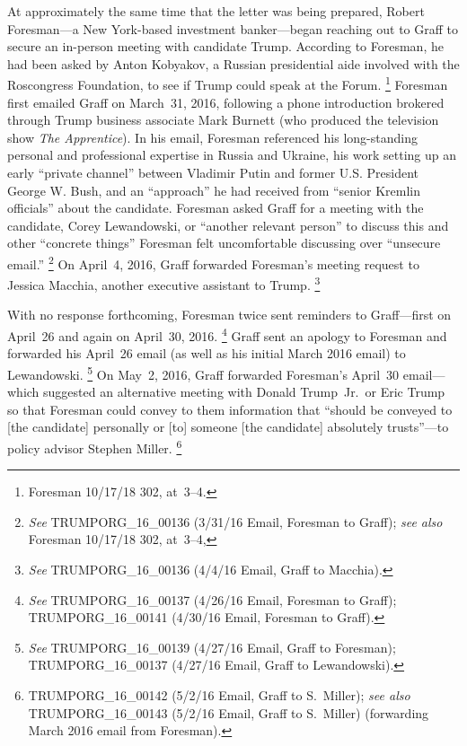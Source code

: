 At approximately the same time that the letter was being prepared, Robert Foresman---a New York-based investment banker---began reaching out to Graff to secure an in-person meeting with candidate Trump.
According to Foresman, he had been asked by Anton Kobyakov, a Russian presidential aide involved with the Roscongress Foundation, to see if Trump could speak at the Forum.%
\footnote{Foresman 10/17/18 302, at~3--4.}
Foresman first emailed Graff on March~31, 2016, following a phone introduction brokered through Trump business associate Mark Burnett (who produced the television show \textit{The Apprentice}).
In his email, Foresman referenced his long-standing personal and professional expertise in Russia and Ukraine, his work setting up an early ``private channel'' between Vladimir Putin and former U.S. President George W. Bush, and an ``approach'' he had received from ``senior Kremlin officials'' about the candidate.
Foresman asked Graff for a meeting with the candidate, Corey Lewandowski, or ``another relevant person'' to discuss this and other ``concrete things'' Foresman felt uncomfortable discussing over ``unsecure email.''%
\footnote{\textit{See} TRUMPORG\_16\_00136 (3/31/16 Email, Foresman to Graff);
\textit{see also} Foresman 10/17/18 302, at~3--4,}
On April~4, 2016, Graff forwarded Foresman's meeting request to Jessica Macchia, another executive assistant to Trump.%
\footnote{\textit{See} TRUMPORG\_16\_00136 (4/4/16 Email, Graff to Macchia).}

With no response forthcoming, Foresman twice sent reminders to Graff---first on April~26 and again on April~30, 2016.%
\footnote{\textit{See} TRUMPORG\_16\_00137 (4/26/16 Email, Foresman to Graff);
TRUMPORG\_16\_00141 (4/30/16 Email, Foresman to Graff).}
Graff sent an apology to Foresman and forwarded his April~26 email (as well as his initial March 2016 email) to Lewandowski.%
\footnote{\textit{See} TRUMPORG\_16\_00139 (4/27/16 Email, Graff to Foresman);
TRUMPORG\_16\_00137 (4/27/16 Email, Graff to Lewandowski).}
On May~2, 2016, Graff forwarded Foresman's April~30 email---which suggested an alternative meeting with Donald Trump~Jr.\ or Eric Trump so that Foresman could convey to them information that ``should be conveyed to [the candidate] personally or [to] someone [the candidate] absolutely trusts''---to policy advisor Stephen Miller.%
\footnote{TRUMPORG\_16\_00142 (5/2/16 Email, Graff to S.~Miller);
\textit{see also} TRUMPORG\_16\_00143 (5/2/16 Email, Graff to S.~Miller) (forwarding March 2016 email from Foresman).}

